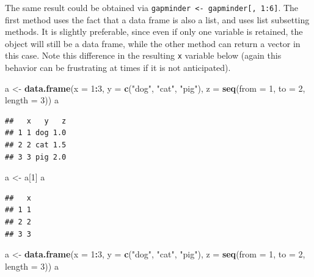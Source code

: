 \documentclass[
]{krantz}
\newenvironment{Shaded}{\begin{snugshade}}{\end{snugshade}}
\newcommand{\DataTypeTok}[1]{\textcolor[rgb]{0.13,0.29,0.53}{#1}}
\newcommand{\DecValTok}[1]{\textcolor[rgb]{0.00,0.00,0.81}{#1}}
\newcommand{\KeywordTok}[1]{\textcolor[rgb]{0.13,0.29,0.53}{\textbf{#1}}}
\newcommand{\NormalTok}[1]{#1}
\newcommand{\OperatorTok}[1]{\textcolor[rgb]{0.81,0.36,0.00}{\textbf{#1}}}
\newcommand{\StringTok}[1]{\textcolor[rgb]{0.31,0.60,0.02}{#1}}
\begin{document}
The same result could be obtained via \texttt{gapminder\ \textless{}-\ gapminder{[},\ 1:6{]}}. The first method uses the fact that a data frame is also a list, and uses list subsetting methods. It is slightly preferable, since even if only one variable is retained, the object will still be a data frame, while the other method can return a vector in this case. Note this difference in the resulting \texttt{x} variable below (again this behavior can be frustrating at times if it is not anticipated).

\begin{Shaded}
\begin{Highlighting}[]
\NormalTok{a \textless{}{-}}\StringTok{ }\KeywordTok{data.frame}\NormalTok{(}\DataTypeTok{x =} \DecValTok{1}\OperatorTok{:}\DecValTok{3}\NormalTok{, }\DataTypeTok{y =} \KeywordTok{c}\NormalTok{(}\StringTok{"dog"}\NormalTok{, }\StringTok{"cat"}\NormalTok{, }\StringTok{"pig"}\NormalTok{), }
                \DataTypeTok{z =} \KeywordTok{seq}\NormalTok{(}\DataTypeTok{from =} \DecValTok{1}\NormalTok{, }\DataTypeTok{to =} \DecValTok{2}\NormalTok{, }\DataTypeTok{length =} \DecValTok{3}\NormalTok{))}
\NormalTok{a}
\end{Highlighting}
\end{Shaded}

\begin{verbatim}
##   x   y   z
## 1 1 dog 1.0
## 2 2 cat 1.5
## 3 3 pig 2.0
\end{verbatim}

\begin{Shaded}
\begin{Highlighting}[]
\NormalTok{a \textless{}{-}}\StringTok{ }\NormalTok{a[}\DecValTok{1}\NormalTok{]}
\NormalTok{a }
\end{Highlighting}
\end{Shaded}

\begin{verbatim}
##   x
## 1 1
## 2 2
## 3 3
\end{verbatim}

\begin{Shaded}
\begin{Highlighting}[]
\NormalTok{a \textless{}{-}}\StringTok{ }\KeywordTok{data.frame}\NormalTok{(}\DataTypeTok{x =} \DecValTok{1}\OperatorTok{:}\DecValTok{3}\NormalTok{, }\DataTypeTok{y =} \KeywordTok{c}\NormalTok{(}\StringTok{"dog"}\NormalTok{, }\StringTok{"cat"}\NormalTok{, }\StringTok{"pig"}\NormalTok{), }
                \DataTypeTok{z =} \KeywordTok{seq}\NormalTok{(}\DataTypeTok{from =} \DecValTok{1}\NormalTok{, }\DataTypeTok{to =} \DecValTok{2}\NormalTok{, }\DataTypeTok{length =} \DecValTok{3}\NormalTok{))}
\NormalTok{a }
\end{Highlighting}
\end{Shaded}
\end{document}
